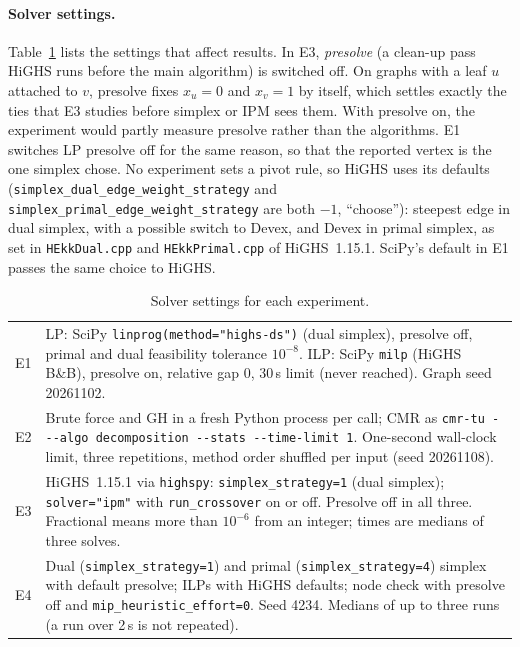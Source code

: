 \paragraph{Solver settings.} Table~\ref{tab:settings} lists the settings that affect results. In E3, \emph{presolve} (a clean-up pass HiGHS runs before the main algorithm) is switched off. On graphs with a leaf $u$ attached to $v$, presolve fixes $x_u=0$ and $x_v=1$ by itself, which settles exactly the ties that E3 studies before simplex or IPM sees them. With presolve on, the experiment would partly measure presolve rather than the algorithms. E1 switches LP presolve off for the same reason, so that the reported vertex is the one simplex chose. No experiment sets a pivot rule, so HiGHS uses its defaults (\texttt{simplex\_dual\_edge\_weight\_strategy} and \texttt{simplex\_primal\_edge\_weight\_strategy} are both $-1$, ``choose''): steepest edge in dual simplex, with a possible switch to Devex, and Devex in primal simplex, as set in \texttt{HEkkDual.cpp} and \texttt{HEkkPrimal.cpp} of HiGHS~1.15.1. SciPy's default in E1 passes the same choice to HiGHS.

\begin{table}[H]
  \centering\small
  \caption{Solver settings for each experiment.}
  \label{tab:settings}
  \begin{tabular}{@{}lp{}@{}}
    \toprule
    E1 & LP: SciPy \texttt{linprog(method="highs-ds")} (dual simplex), presolve off, primal and dual feasibility tolerance $10^{-8}$. ILP: SciPy \texttt{milp} (HiGHS B\&B), presolve on, relative gap $0$, 30\,s limit (never reached). Graph seed 20261102. \\
    E2 & Brute force and GH in a fresh Python process per call; CMR as \texttt{cmr-tu - -{}-algo decomposition -{}-stats -{}-time-limit 1}. One-second wall-clock limit, three repetitions, method order shuffled per input (seed 20261108). \\
    E3 & HiGHS~1.15.1 via \texttt{highspy}: \texttt{simplex\_strategy=1} (dual simplex); \texttt{solver="ipm"} with \texttt{run\_crossover} on or off. Presolve off in all three. Fractional means more than $10^{-6}$ from an integer; times are medians of three solves. \\
    E4 & Dual (\texttt{simplex\_strategy=1}) and primal (\texttt{simplex\_strategy=4}) simplex with default presolve; ILPs with HiGHS defaults; node check with presolve off and \texttt{mip\_heuristic\_effort=0}. Seed 4234. Medians of up to three runs (a run over 2\,s is not repeated). \\
    \bottomrule
  \end{tabular}
\end{table}


